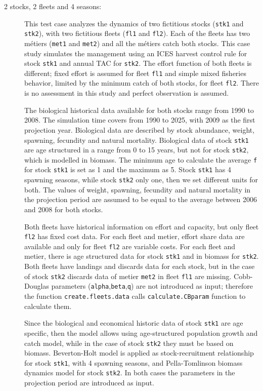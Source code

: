 \begin{description}
    \item[2 stocks, 2 fleets and 4 seasons:] This test case analyzes the dynamics of two fictitious stocks (\texttt{stk1} and \texttt{stk2}), with two fictitious fleets (\texttt{fl1} and \texttt{fl2}). Each of the fleets has two m\'etiers (\texttt{met1} and \texttt{met2}) and all the m\'etiers catch both stocks. This case study simulates the management using an ICES harvest control rule for stock \texttt{stk1} and annual TAC for \texttt{stk2}. The effort function of both fleets is different; fixed effort is assumed for fleet \texttt{fl1} and simple mixed fisheries behavior, limited by the minimum catch of both stocks, for fleet \texttt{fl2}. There is no assessment in this study and perfect observation is assumed.

The biological historical data available for both stocks range from 1990 to 2008. The simulation time covers from 1990 to 2025, with 2009 as the first projection year. Biological data are described by stock abundance, weight, spawning, fecundity and natural mortality. Biological data of stock \texttt{stk1} are age structured in a range from 0 to 15 years, but not for stock \texttt{stk2}, which is modelled in biomass. The minimum age to calculate the average \texttt{f} for stock \texttt{stk1} is set as 1 and the maximum as 5. Stock \texttt{stk1} has 4 spawning seasons, while stock \texttt{stk2} only one, then we set different units for both. The values of weight, spawning, fecundity and natural mortality in the projection period are assumed to be equal to the average between 2006 and 2008 for both stocks.

Both fleets have historical information on effort and capacity, but only fleet \texttt{fl2} has fixed cost data. For each fleet and metier, effort share data are available and only for fleet \texttt{fl2} are variable costs. For each fleet and metier, there is age structured data for stock \texttt{stk1} and in biomass for \texttt{stk2}. Both fleets have landings and discards data for each stock, but in the case of stock \texttt{stk2} discards data of metier \texttt{met2} in fleet \texttt{fl1} are missing. Cobb-Douglas parameters (\texttt{alpha},\texttt{beta},\texttt{q}) are not introduced as input; therefore the function \texttt{create.fleets.data} calls \texttt{calculate.CBparam} function to calculate them.

Since the biological and economical historic data of stock \texttt{stk1} are age specific, then the model allows using age-structured population growth and catch model, while in the case of stock \texttt{stk2} they must be based on biomass. Beverton-Holt model is applied as stock-recruitment relationship for stock \texttt{stk1}, with 4 spawning seasons, and Pella-Tomlinson biomass dynamics model for stock \texttt{stk2}. In both cases the parameters in the projection period are introduced as input.  
\end{description}

